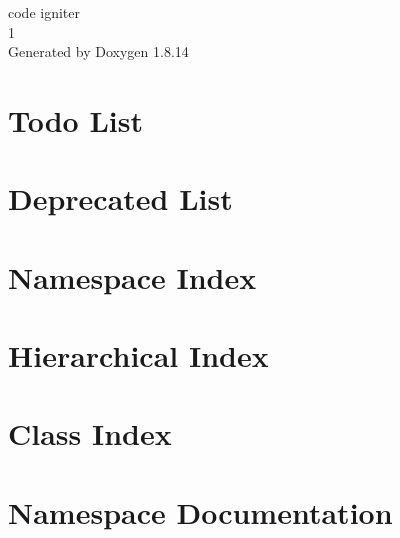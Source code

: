 \documentclass[twoside]{book}
\newcommand{\+}{\discretionary{\mbox{\scriptsize$\hookleftarrow$}}{}{}}
\newcommand{\clearemptydoublepage}{%
  \newpage{\pagestyle{empty}\cleardoublepage}%
}
\begin{document}
\hypersetup{pageanchor=false,
             bookmarksnumbered=true,
             pdfencoding=unicode
            }
\begin{titlepage}
\vspace*{7cm}
\begin{center}%
{\Large code igniter \\[1ex]\large 1 }\\
\vspace*{1cm}
{\large Generated by Doxygen 1.8.14}\\
\end{center}
\end{titlepage}
\clearemptydoublepage
{}
\tableofcontents
\clearemptydoublepage
{}
\hypersetup{pageanchor=true}

\chapter{Todo List}
\label{todo}

\chapter{Deprecated List}
\label{deprecated}

\chapter{Namespace Index}

\chapter{Hierarchical Index}

\chapter{Class Index}

\chapter{Namespace Documentation}

\end{document}
